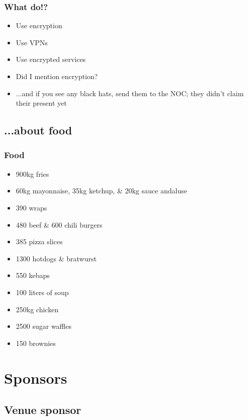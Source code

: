 \documentclass[t]{beamer}
\begin{document}
\begin{frame}
	\frametitle{What do!?}
	\vfill
	\begin{itemize}
		\item Use encryption
		\item Use VPNs
		\item Use encrypted services
		\item Did I mention encryption?
		\item ...and if you see any black hats, send them to the NOC; they didn't claim their present yet
	\end{itemize}
	\vfill
\end{frame}

\subsection{...about food}

\begin{frame}
	\frametitle{Food}
	\vfill
	\begin{itemize}
		\item 900kg fries
		\item 60kg mayonnaise, 35kg ketchup, \& 20kg sauce andaluse
		\item 390 wraps
		\item 480 beef \& 600 chili burgers
		\item 385 pizza slices
		\item 1300 hotdogs \& bratwurst
		\item 550 kebaps
		\item 100 liters of soup
		\item 250kg chicken
		\item 2500 sugar waffles
		\item 150 brownies
	\end{itemize}
	\vfill
\end{frame}

\section{Sponsors}


\subsection{Venue sponsor}
\end{document}
